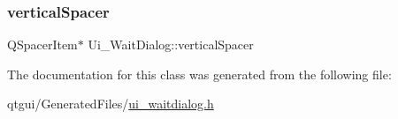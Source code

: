 \mbox{\label{class_ui___wait_dialog_a873f28b846c101a22a113ef950e167ee}} 
\subsubsection{\texorpdfstring{verticalSpacer}{verticalSpacer}}
{\footnotesize\ttfamily Q\+Spacer\+Item$\ast$ Ui\+\_\+\+Wait\+Dialog\+::vertical\+Spacer}



The documentation for this class was generated from the following file\+:\begin{DoxyCompactItemize}
\item 
qtgui/\+Generated\+Files/\mbox{\hyperlink{ui__waitdialog_8h}{ui\+\_\+waitdialog.\+h}}\end{DoxyCompactItemize}
